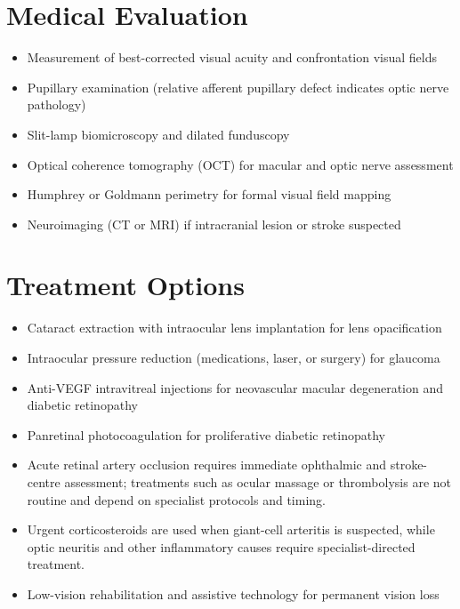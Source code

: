 \section*{Medical Evaluation}
\begin{itemize}
 \item Measurement of best-corrected visual acuity and confrontation visual fields
 \item Pupillary examination (relative afferent pupillary defect indicates optic nerve pathology)
 \item Slit-lamp biomicroscopy and dilated funduscopy
 \item Optical coherence tomography (OCT) for macular and optic nerve assessment
 \item Humphrey or Goldmann perimetry for formal visual field mapping
 \item Neuroimaging (CT or MRI) if intracranial lesion or stroke suspected
\end{itemize}

\section*{Treatment Options}
\begin{itemize}
 \item Cataract extraction with intraocular lens implantation for lens opacification
 \item Intraocular pressure reduction (medications, laser, or surgery) for glaucoma
 \item Anti-VEGF intravitreal injections for neovascular macular degeneration and diabetic retinopathy
 \item Panretinal photocoagulation for proliferative diabetic retinopathy
 \item Acute retinal artery occlusion requires immediate ophthalmic and stroke-centre assessment; treatments such as ocular massage or thrombolysis are not routine and depend on specialist protocols and timing.
 \item Urgent corticosteroids are used when giant-cell arteritis is suspected, while optic neuritis and other inflammatory causes require specialist-directed treatment.
 \item Low-vision rehabilitation and assistive technology for permanent vision loss
\end{itemize}

